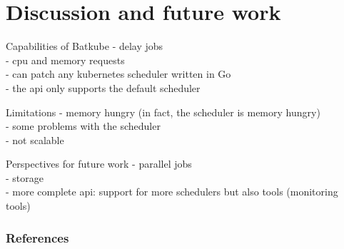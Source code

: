 \documentclass[12pt, aspectratio=43]{beamer}
\begin{document}
\section{Discussion and future work}
\begin{frame}{Capabilities of Batkube}
	- delay jobs\\
	- cpu and memory requests\\
	- can patch any kubernetes scheduler written in Go\\
	- the api only supports the default scheduler
\end{frame}

\begin{frame}{Limitations}
	- memory hungry (in fact, the scheduler is memory hungry)\\
	- some problems with the scheduler\\
	- not scalable
\end{frame}

\begin{frame}{Perspectives for future work}
	- parallel jobs\\
	- storage\\
	- more complete api: support for more schedulers but also tools (monitoring tools)
\end{frame}

\begin{frame}[allowframebreaks]
        \frametitle{References}
	\printbibliography
\end{frame}
\end{document}
